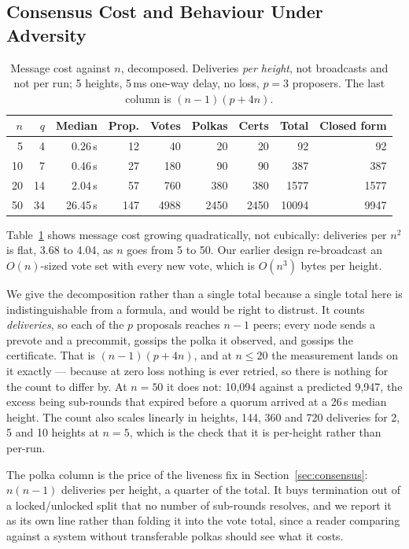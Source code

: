 \documentclass{llncs}
\begin{document}
\subsection{Consensus Cost and Behaviour Under Adversity}
\label{sec:eval-consensus}

\begin{table}[t]
\centering
\caption{Message cost against $n$, decomposed. Deliveries \emph{per height},
not broadcasts and not per run; 5 heights, 5\,ms one-way delay, no loss, $p=3$
proposers. The last column is $(n-1)(p+4n)$.}
\label{tab:scale}
\begin{tabular}{rrrrrrrrr}
\toprule
$n$ & $q$ & \textbf{Median} & \textbf{Prop.} & \textbf{Votes} &
\textbf{Polkas} & \textbf{Certs} & \textbf{Total} & \textbf{Closed form} \\
\midrule
5  & 4  & 0.26\,s  & 12  & 40   & 20   & 20   & 92    & 92 \\
10 & 7  & 0.46\,s  & 27  & 180  & 90   & 90   & 387   & 387 \\
20 & 14 & 2.04\,s  & 57  & 760  & 380  & 380  & 1577  & 1577 \\
50 & 34 & 26.45\,s & 147 & 4988 & 2450 & 2450 & 10094 & 9947 \\
\bottomrule
\end{tabular}
\end{table}

Table~\ref{tab:scale} shows message cost growing quadratically, not cubically:
deliveries per $n^2$ is flat, 3.68 to 4.04, as $n$ goes from 5 to 50. Our
earlier design re-broadcast an $O(n)$-sized vote set with every new vote, which
is $O(n^3)$ bytes per height.

We give the decomposition rather than a single total because a single total here
is indistinguishable from a formula, and would be right to distrust. It counts
\emph{deliveries}, so each of the $p$ proposals reaches $n-1$ peers; every node
sends a prevote and a precommit, gossips the polka it observed, and gossips the
certificate. That is $(n-1)(p + 4n)$, and at $n \le 20$ the measurement lands on
it exactly --- because at zero loss nothing is ever retried, so there is nothing
for the count to differ by. At $n = 50$ it does not: 10{,}094 against a predicted
9{,}947, the excess being sub-rounds that expired before a quorum arrived at a
26\,s median height. The count also scales linearly in heights, 144, 360 and 720
deliveries for 2, 5 and 10 heights at $n=5$, which is the check that it is
per-height rather than per-run.

The polka column is the price of the liveness fix in Section~\ref{sec:consensus}:
$n(n-1)$ deliveries per height, a quarter of the total. It buys termination out
of a locked/unlocked split that no number of sub-rounds resolves, and we report
it as its own line rather than folding it into the vote total, since a reader
comparing against a system without transferable polkas should see what it costs.
\end{document}
